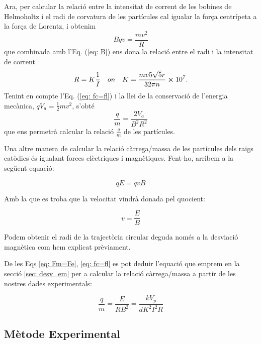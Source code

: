 \documentclass[11pt]{article}
\numberwithin{equation}{section}
\numberwithin{figure}{section}
\numberwithin{table}{section}
\begin{document}
Ara, per calcular la relació entre la intensitat de corrent de les bobines de Helmoholtz i el radi de corvatura de les partícules cal igualar la força centrípeta a la força de Lorentz, i obtenim 
\begin{equation}
    Bqv=\frac{mv^2}{R}
    \label{eq: fc=fl}
\end{equation}
que combinada amb l'Eq. (\ref{eq: B}) ens dona la relació entre el radi i la intensitat de corrent
\begin{equation}
    R=K\frac{1}{I} \quad on \quad K=\frac{mv5\sqrt{5}r}{32\pi n}\cross 10^7.
    \label{eq: IvsR}
\end{equation}
Tenint en compte l'Eq. (\ref{eq: fc=fl}) i la llei de la conservació de l'energia mecànica, $qV_a = \frac{1}{2}mv^2$, s'obté 
\begin{equation}
    \frac{q}{m}=\frac{2V_a }{B^2R^2}
    \label{eq: q/m}
\end{equation}
que ens permetrà calcular la relació $\frac{q}{m}$ de les partícules.


\vspace{1cm}

Una altre manera de calcular la relació càrrega/massa de les partícules dels raigs catòdics és igualant forces elèctriques i magnètiques. Fent-ho, arribem a la següent equació:

\begin{equation}\label{eq: Fm=Fe}
    qE = qvB
\end{equation}

Amb la que es troba que la velocitat vindrà donada pel quocient:

\begin{equation}
    v = \frac{E}{B}
\end{equation}

Podem obtenir el radi de la trajectòria circular deguda només a la desviació magnètica com hem explicat prèviament.

De les Eqs \eqref{eq: Fm=Fe}, \eqref{eq: fc=fl} es pot deduir l'equació que emprem en la secció \ref{sec: desv_em} per a calcular la relació càrrega/massa a partir de les nostres dades experimentals:

\begin{equation}
    \frac{q}{m}=\frac{E}{RB^2}=\frac{kV_p}{dK^2I^2R}
\end{equation}

\newpage
\subsection{Mètode Experimental}
\end{document}
